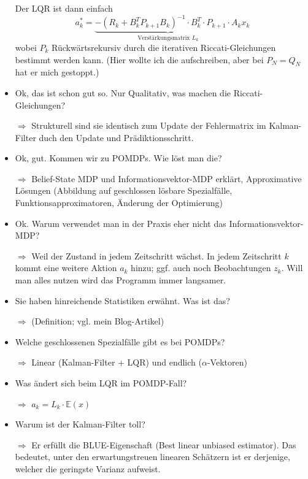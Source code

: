 \documentclass[a4paper]{article}
\begin{document}
\begin{itemize}
        Der LQR ist dann einfach
        $$a_k^* = \underbrace{-{(R_k + B_k^T P_{k+1} B_k)}^{-1} \cdot B_k^T \cdot P_{k+1} \cdot A_k}_{\text{Verstärkungsmatrix } L_k} x_k$$
        wobei $P_k$ Rückwärtsrekursiv durch die iterativen Riccati-Gleichungen
        bestimmt werden kann. (Hier wollte ich die aufschreiben, aber bei $P_N = Q_N$
        hat er mich gestoppt.)
        \item Ok, das ist schon gut so. Nur Qualitativ, was machen die
              Riccati-Gleichungen?
        \item[$\Rightarrow$] Strukturell sind sie identisch zum Update der
                             Fehlermatrix im Kalman-Filter duch den Update und
                             Prädiktionsschritt.
        \item Ok, gut. Kommen wir zu POMDPs. Wie löst man die?
        \item[$\Rightarrow$] Belief-State MDP und Informationsvektor-MDP erklärt,
        Approximative Lösungen (Abbildung auf geschlossen lösbare Spezialfälle, Funktionsapproximatoren, Änderung der Optimierung)
        \item Ok. Warum verwendet man in der Praxis eher nicht das Informationsvektor-MDP?
        \item[$\Rightarrow$] Weil der Zustand in jedem Zeitschritt wächst.
                             In jedem Zeitschritt $k$ kommt eine weitere
                             Aktion $a_k$ hinzu; ggf. auch noch Beobachtungen
                             $z_k$. Will man alles nutzen wird das Programm
                             immer langsamer.
        \item Sie haben hinreichende Statistiken erwähnt. Was ist das?
        \item[$\Rightarrow$] (Definition; vgl. mein Blog-Artikel)
        \item Welche geschlossenen Spezialfälle gibt es bei POMDPs?
        \item[$\Rightarrow$] Linear (Kalman-Filter + LQR) und endlich ($\alpha$-Vektoren)
        \item Was ändert sich beim LQR im POMDP-Fall?
        \item[$\Rightarrow$] $a_k = L_k \cdot \mathbb{E}(x)$
        \item Warum ist der Kalman-Filter toll?
        \item[$\Rightarrow$] Er erfüllt die BLUE-Eigenschaft (Best linear unbiased estimator).
          Das bedeutet, unter den erwartungstreuen linearen Schätzern ist
          er derjenige, welcher die geringste Varianz aufweist.

\end{itemize}
\end{document}
